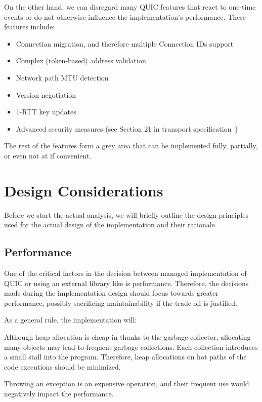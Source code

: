 On the other hand, we can disregard many QUIC features that react to one-time events or do not
otherwise influence the implementation's performance. These features include:

\begin{itemize}

    \item Connection migration, and therefore multiple Connection IDs support

    \item Complex (token-based) address validation

    \item Network path MTU detection

    \item Version negotiation

    \item 1-RTT key updates

    \item Advanced security measures (see Section 21 in transport
specification~\cite{draft-ietf-quic-transport})

\end{itemize}

The rest of the features form a grey area that can be implemented fully, partially, or even not at
if convenient.

\section{Design Considerations}

Before we start the actual analysis, we will briefly outline the design principles used for the
actual design of the implementation and their rationale.

\subsection{Performance}

One of the critical factors in the decision between managed \dotnet{} implementation of QUIC or
using an external library like \libmsquic{} is performance. Therefore, the decisions made during the
implementation design should focus towards greater performance, possibly sacrificing maintainability
if the trade-off is justified.

As a general rule, the implementation will:

\begin{itemize}

     Although heap allocation is cheap in \dotnet{} thanks
to the garbage collector, allocating many objects may lead to frequent garbage collections. Each
collection introduces a small stall into the program. Therefore, heap allocations on hot paths of
the code executions should be minimized.

     Throwing an exception is an expensive operation, and
their frequent use would negatively impact the performance.

\end{itemize}

